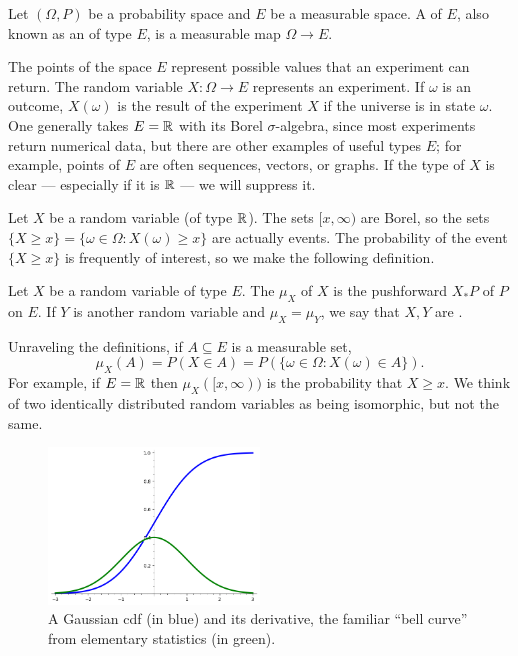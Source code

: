 \begin{definition}
Let $(\Omega, P)$ be a probability space and $E$ be a measurable space.
A  of  $E$, also known as an  of type $E$, is a measurable map $\Omega \to E$.
\end{definition}

\begin{subsec}
The points of the space $E$ represent possible values that an experiment can return.
The random variable $X: \Omega \to E$ represents an experiment. If $\omega$ is an outcome, $X(\omega)$ is the result of the experiment $X$ if the universe is in state $\omega$.
One generally takes $E = \mathbb{R}$ with its Borel $\sigma$-algebra, since most experiments return numerical data, but there are other examples of useful types $E$; for example, points of $E$ are often sequences, vectors, or graphs.
If the type of $X$ is clear --- especially if it is $\mathbb{R}$ --- we will suppress it.
\end{subsec}

\begin{subsec}
Let $X$ be a random variable (of type $\mathbb{R}$).
The sets $[x, \infty)$ are Borel, so the sets $\{X \geq x\} = \{\omega \in \Omega: X(\omega) \geq x\}$ are actually events.
The probability of the event $\{X \geq x\}$ is frequently of interest, so we make the following definition.
\end{subsec}

\begin{definition}
Let $X$ be a random variable of type $E$.
The  $\mu_{X}$ of $X$ is the pushforward $X_{*}P$ of $P$ on $E$.
If $Y$ is another random variable and $\mu_{X} = \mu_{Y}$, we say that $X,Y$ are .
\end{definition}

\begin{subsec}
Unraveling the definitions, if $A \subseteq E$ is a measurable set,
\[\mu_{X}(A) = P(X \in A) = P(\{\omega \in \Omega: X(\omega) \in A\}).\]
For example, if $E = \mathbb{R}$ then $\mu_{X}([x, \infty))$ is the probability that $X \geq x$.
We think of two identically distributed random variables as being isomorphic, but not the same.
\end{subsec}

\begin{figure}\label{bell curve figure}
\caption{A Gaussian cdf (in blue) and its derivative, the familiar ``bell curve'' from elementary statistics (in green).}
\centering \includegraphics[width=0.5\textwidth]{graphics/bell_curve}
\end{figure}

